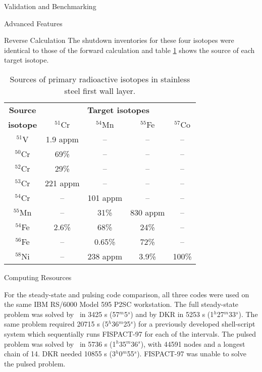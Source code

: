 \begin{chapter}{Validation and Benchmarking}
\begin{section}{Advanced Features}
\begin{subsection}{Reverse Calculation}
      The shutdown inventories for these four isotopes were identical
      to those of the forward calculation and table
      \ref{tab:valid.reverse} shows the source of each target isotope.

      \begin{table}[htbp]
        \begin{center}
          \leavevmode
          \begin{tabular}{|c|c|c|c|c|}
            \hline
            \textbf{Source}  & \multicolumn{4}{c|}{\textbf{Target isotopes}} \\\cline{2-5}
            \textbf{isotope} & $^{51}$Cr & $^{54}$Mn & $^{55}$Fe & $^{57}$Co \\\hline\hline
            $^{51}$V & 1.9 appm &  -- &  -- &  -- \\\hline
            $^{50}$Cr & 69\% & -- &  -- &  -- \\\hline
            $^{52}$Cr & 29\% & -- &  -- &  -- \\\hline
            $^{53}$Cr & 221 appm & -- &  -- &  -- \\\hline
            $^{54}$Cr & -- & 101 appm &  -- &  -- \\\hline
            $^{55}$Mn & -- & 31\% & 830 appm &  -- \\\hline
            $^{54}$Fe & 2.6\%  & 68\% & 24\% &  -- \\\hline
            $^{56}$Fe & -- & 0.65\%  & 72\%  &  -- \\\hline
            $^{58}$Ni & -- & 238 appm & 3.9\% &  100\%\\\hline
          \end{tabular}
          \caption{Sources of primary radioactive isotopes in stainless steel first wall layer.}
          \label{tab:valid.reverse}
        \end{center}
      \end{table}
      
    \end{subsection}
  \end{section}
  
  \begin{section}{Computing Resources}
    

    For the steady-state and pulsing code comparison, all three codes
    were used on the same IBM RS/6000 Model 595 P2SC workstation.  The
    full steady-state problem was solved by \ALARA\ in 3425 s
    (57$^m$5$^s$) and by DKR in 5253 s (1$^h$27$^m$33$^s$).  The same
    problem required 20715 s (5$^h$36$^m$25$^s$) for a previously
    developed shell-script system which sequentially runs FISPACT-97
    for each of the intervals.  The pulsed problem was solved by
    \ALARA\ in 5736 s (1$^h$35$^m$36$^s$), with 44591 nodes and a
    longest chain of 14.  DKR needed 10855 s (3$^h$0$^m$55$^s$).
    FISPACT-97 was unable to solve the pulsed problem.
    

\end{section}
\end{chapter}
